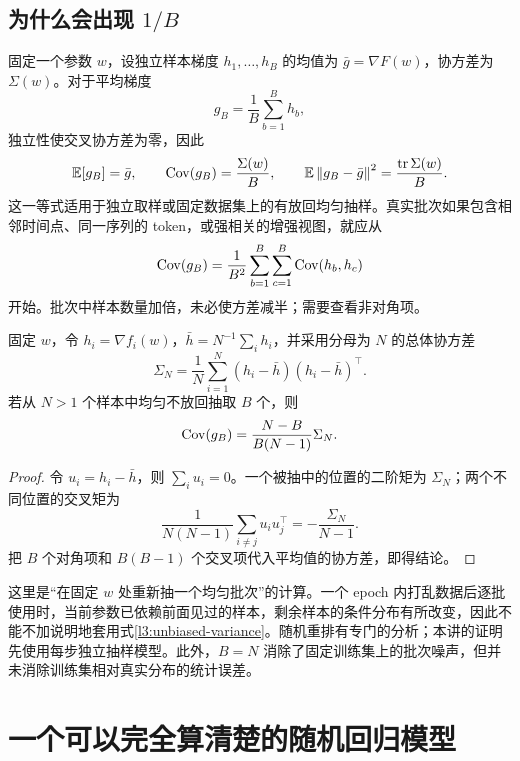 \subsection{为什么会出现 $1/B$}

固定一个参数 $w$，设独立样本梯度 $h_1,\ldots,h_B$ 的均值为 $\bar g=\nabla F(w)$，协方差为 $\Sigma(w)$。对于平均梯度
\[
 g_B=\frac1B\sum_{b=1}^{B}h_b,
\]
独立性使交叉协方差为零，因此
\begin{equation}
 \mathbb E[g_B]=\bar g,\qquad
 \operatorname{Cov}(g_B)=\frac{\Sigma(w)}{B},\qquad
 \mathbb E\left\lVert g_B-\bar g\right\rVert^2=\frac{\operatorname{tr}\Sigma(w)}{B}.
 \label{l3:batch-variance}
\end{equation}
这一等式适用于独立取样或固定数据集上的有放回均匀抽样。真实批次如果包含相邻时间点、同一序列的 token，或强相关的增强视图，就应从
\begin{equation}
 \operatorname{Cov}(g_B)=\frac1{B^2}\sum_{b=1}^{B}\sum_{c=1}^{B}\operatorname{Cov}(h_b,h_c)
 \label{l3:correlated-batch}
\end{equation}
开始。批次中样本数量加倍，未必使方差减半；需要查看非对角项。

\begin{proposition}[不放回批次的有限总体修正，选读]
固定 $w$，令 $h_i=\nabla f_i(w)$，$\bar h=N^{-1}\sum_i h_i$，并采用分母为 $N$ 的总体协方差
\[
 \Sigma_N=\frac1N\sum_{i=1}^{N}(h_i-\bar h)(h_i-\bar h)^\top.
\]
若从 $N>1$ 个样本中均匀不放回抽取 $B$ 个，则
\begin{equation}
 \operatorname{Cov}(g_B)=\frac{N-B}{B(N-1)}\Sigma_N.
 \label{l3:finite-population}
\end{equation}
\end{proposition}
\begin{proof}
令 $u_i=h_i-\bar h$，则 $\sum_i u_i=0$。一个被抽中的位置的二阶矩为 $\Sigma_N$；两个不同位置的交叉矩为
\[
 \frac{1}{N(N-1)}\sum_{i\ne j}u_i u_j^\top
 =-\frac{\Sigma_N}{N-1}.
\]
把 $B$ 个对角项和 $B(B-1)$ 个交叉项代入平均值的协方差，即得结论。
\end{proof}

这里是“在固定 $w$ 处重新抽一个均匀批次”的计算。一个 epoch 内打乱数据后逐批使用时，当前参数已依赖前面见过的样本，剩余样本的条件分布有所改变，因此不能不加说明地套用式\eqref{l3:unbiased-variance}。随机重排有专门的分析；本讲的证明先使用每步独立抽样模型。此外，$B=N$ 消除了固定训练集上的批次噪声，但并未消除训练集相对真实分布的统计误差。

\section{一个可以完全算清楚的随机回归模型}
\label{l3:gaussian-regression}

